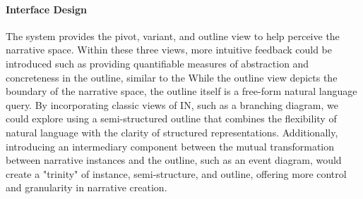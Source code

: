 
\paragraph{Interface Design} 
The system provides the pivot, variant, and outline view to help perceive the narrative space. Within these three views, more intuitive feedback could be introduced such as providing quantifiable measures of abstraction and concreteness in the outline, similar to the  While the outline view depicts the boundary of the narrative space, the outline itself is a free-form natural language query. By incorporating classic views of IN, such as a branching diagram, we could explore using a semi-structured outline that combines the flexibility of natural language with the clarity of structured representations. Additionally, introducing an intermediary component between the mutual transformation between narrative instances and the outline, such as an event diagram, would create a "trinity" of instance, semi-structure, and outline, offering more control and granularity in narrative creation.


